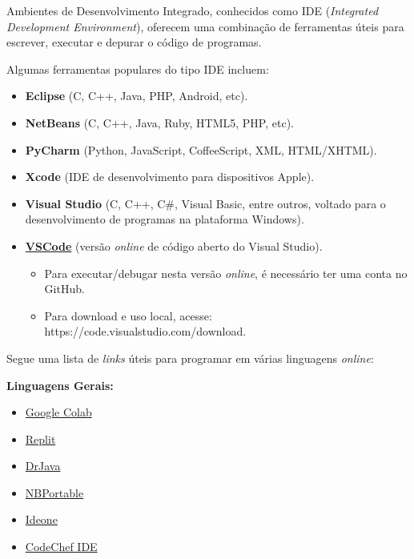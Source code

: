 \documentclass[12pt,a4paper]{article}
\providecommand{\tightlist}{%
      \setlength{\itemsep}{0pt}\setlength{\parskip}{0pt}}
\begin{document}
    Ambientes de Desenvolvimento Integrado, conhecidos como IDE
(\emph{Integrated Development Environment}), oferecem uma combinação de
ferramentas úteis para escrever, executar e depurar o código de
programas.

    Algumas ferramentas populares do tipo IDE incluem:

\begin{itemize}
\tightlist
\item
  \textbf{Eclipse} (C, C++, Java, PHP, Android, etc).
\item
  \textbf{NetBeans} (C, C++, Java, Ruby, HTML5, PHP, etc).
\item
  \textbf{PyCharm} (Python, JavaScript, CoffeeScript, XML, HTML/XHTML).
\item
  \textbf{Xcode} (IDE de desenvolvimento para dispositivos Apple).
\item
  \textbf{Visual Studio} (C, C++, C\#, Visual Basic, entre outros,
  voltado para o desenvolvimento de programas na plataforma Windows).
\item
  \textbf{\href{https://vscode.dev}{VSCode}} (versão \emph{online} de
  código aberto do Visual Studio).

  \begin{itemize}
  \tightlist
  \item
    Para executar/debugar nesta versão \emph{online}, é necessário ter
    uma conta no GitHub.
  \item
    Para download e uso local, acesse:
    https://code.visualstudio.com/download.
  \end{itemize}
\end{itemize}

    Segue uma lista de \emph{links} úteis para programar em várias
linguagens \emph{online}:

\textbf{Linguagens Gerais:}

\begin{itemize}
\tightlist
\item
  \href{https://colab.research.google.com}{Google Colab}
\item
  \href{https://replit.com/languages}{Replit}
\item
  \href{http://www.drjava.org}{DrJava}
\item
  \href{https://sourceforge.net/projects/nbportable}{NBPortable}
\item
  \href{https://ideone.com}{Ideone}
\item
  \href{https://www.codechef.com/ide}{CodeChef IDE}
\end{itemize}
\end{document}
